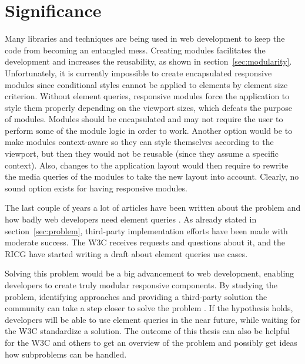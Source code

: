 \documentclass[a4paper,11pt]{kth-mag}
\begin{document}
    \section{Significance}
      Many libraries and techniques are being used in \gls{web} development to keep the code from becoming an entangled mess.
      Creating modules facilitates the development and increases the reusability, as shown in section~\ref{sec:modularity}.
      Unfortunately, it is currently impossible to create \gls{encapsulated} \gls{responsive} modules since conditional styles cannot be applied to \glspl{element} by \gls{element} size criterion.
      Without element queries, \gls{responsive} modules force the application to style them properly depending on the \gls{viewport} sizes, which defeats the purpose of modules.
      Modules should be \gls{encapsulated} and may not require the user to perform some of the module logic in order to work.
      Another option would be to make modules context-aware so they can style themselves according to the \gls{viewport}, but then they would not be reusable (since they assume a specific context).
      Also, changes to the application layout would then require to rewrite the \gls{media queries} of the modules to take the new layout into account.
      Clearly, no sound option exists for having \gls{responsive} modules.

      The last couple of years a lot of articles have been written about the problem and how badly \gls{web} developers need element queries \cite{eq_article_localised-css,eq_article_backalley,eq_article_mqhack,eq_article_tabatkjr,eq_article_filament,eq_article_tyson,eq_article_neal,eq_article_css-tricks,eq_article_hugo,eq_article_fremycompany,eq_article_discource,eq_article_matt}.
      As already stated in section~\ref{sec:problem}, \gls{third-party} implementation efforts have been made with moderate success.
      The \gls{W3C} receives requests and questions about it, and the \gls{RICG} have started writing a draft \cite{ricg_draft} about element queries use cases.

      Solving this problem would be a big advancement to \gls{web} development, enabling developers to create truly modular \gls{responsive} components.
      By studying the problem, identifying approaches and providing a \gls{third-party} solution the community can take a step closer to solve the problem .
      If the hypothesis holds, developers will be able to use element queries in the near future, while waiting for the \gls{W3C} standardize a solution. 
      The outcome of this thesis can also be helpful for the \gls{W3C} and others to get an overview of the problem and possibly get ideas how subproblems can be handled.
\end{document}
